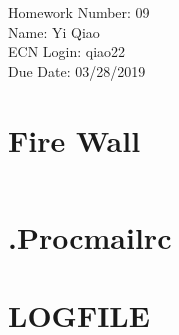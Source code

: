 \documentclass[11pt]{article}
\begin{document}
\noindent Homework Number: 09\\
Name: Yi Qiao\\
ECN Login: qiao22\\
Due Date: 03/28/2019\\

\section*{Fire Wall}
\inputminted[breaklines]{bash}{firewall404.sh}
\pagebreak
\section*{.Procmailrc}

\pagebreak
\section*{LOGFILE}

\pagebreak
\end{document}
